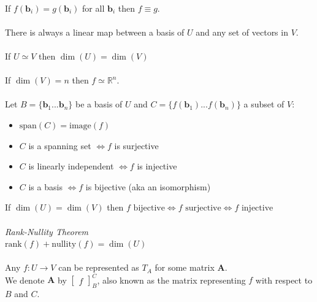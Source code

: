 \documentclass{article}
\newcommand{\R}{\mathbb{R}}
\renewcommand{\vec}[1]{\mathbf{#1}}
\begin{document}
\\
If $ f(\vec{b}_{i}) = g(\vec{b}_{i}) $ for all $ \vec{b}_{i} $ then $ f \equiv g $.
\\\\
There is always a linear map between a basis of $ U $ and any set of vectors in $ V $.
\\\\
If $ U \simeq V $ then $ \dim(U) = \dim(V) $
\\\\
If $ \dim(V) = n $ then $ f \simeq \R^{n} $.
\\\\
Let $ B = \{\vec{b}_{1}...\vec{b}_{n}\} $ be a basis of $ U $ and $ C = \{f(\vec{b}_{1})...f(\vec{b}_{n})\} $ a subset of $ V $:
\begin{itemize}
\item $ \textrm{span}(C) = \textrm{image}(f) $
\item $ C $ is a spanning set $ \Leftrightarrow f $ is surjective
\item $ C $ is linearly independent $ \Leftrightarrow f $ is injective
\item $ C $ is a basis $ \Leftrightarrow f $ is bijective (aka an isomorphism)
\end{itemize}
If $ \dim(U) = \dim(V) $ then $ f \textrm{ bijective} \Leftrightarrow f \textrm{ surjective} \Leftrightarrow f \textrm{ injective} $
\\\\
\textit{Rank-Nullity Theorem}
\\
$ \textrm{rank}(f) + \textrm{nullity}(f) = \dim(U) $
\\\\
Any $ f : U \to V $ can be represented as $ T_{A} $ for some matrix $ \vec{A} $.
\\
We denote $ \vec{A} $ by $
\begin{bmatrix}
f
\end{bmatrix}_{B}^{C} $, also known as the matrix representing $ f $ with respect to $ B $ and $ C $.
\\
\end{document}
